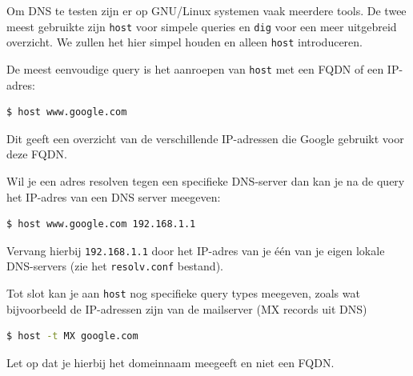 Om DNS te testen zijn er op GNU/Linux systemen vaak meerdere tools. De twee meest gebruikte zijn \texttt{host} voor simpele queries en \texttt{dig} voor een meer uitgebreid overzicht. We zullen het hier simpel houden en alleen \texttt{host} introduceren.

De meest eenvoudige query is het aanroepen van \texttt{host} met een FQDN of een IP-adres:
\begin{lstlisting}[language=bash]
$ host www.google.com
\end{lstlisting}
Dit geeft een overzicht van de verschillende IP-adressen die Google gebruikt voor deze FQDN.

Wil je een adres resolven tegen een specifieke DNS-server dan kan je na de query het IP-adres van een DNS server meegeven:
\begin{lstlisting}[language=bash]
$ host www.google.com 192.168.1.1
\end{lstlisting}
Vervang hierbij \texttt{192.168.1.1} door het IP-adres van je \'e\'en van je eigen lokale DNS-servers (zie het \texttt{resolv.conf} bestand).

Tot slot kan je aan \texttt{host} nog specifieke query types meegeven, zoals wat bijvoorbeeld de IP-adressen zijn van de mailserver (MX records uit DNS)
\begin{lstlisting}[language=bash]
$ host -t MX google.com
\end{lstlisting}
Let op dat je hierbij het domeinnaam meegeeft en niet een FQDN.

